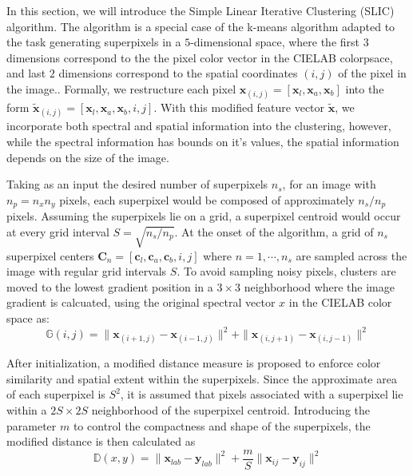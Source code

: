 In this section, we will introduce the Simple Linear Iterative Clustering (SLIC) algorithm. The algorithm is a special case of the k-means algorithm adapted to the task generating superpixels in a $5$-dimensional space, where the first $3$ dimensions correspond to the the pixel color vector in the CIELAB colorpsace, and last $2$ dimensions correspond to the spatial coordinates $(i,j)$ of the pixel in the image.. Formally, we restructure each pixel $\mathbf{x}_{(i,j)} = [\mathbf{x}_l, \mathbf{x}_a, \mathbf{x}_b]$ into the form $\tilde{\mathbf{x}}_{(i,j)} = [\mathbf{x}_l, \mathbf{x}_a, \mathbf{x}_b, i, j]$. With this modified feature vector $\tilde{\mathbf{x}}$, we incorporate both spectral and spatial information into the clustering, however, while the spectral information has bounds on it's values, the spatial information depends on the size of the image. 

Taking as an input the desired number of superpixels $n_s$, for an image with $n_p = n_x n_y$ pixels, each superpixel would be composed of approximately $n_s / n_p$ pixels. Assuming the superpixels lie on a grid, a superpixel centroid would occur at every grid interval $S = \sqrt{n_s/n_p}$. At the onset of the algorithm, a grid of $n_s$ superpixel centers $\mathbf{C}_n = [\mathbf{c}_{l}, \mathbf{c}_{a}, \mathbf{c}_{b}, i, j]$ where $n = 1, \cdots, n_s$ are sampled across the image with regular grid intervals $S$. To avoid sampling noisy pixels, clusters are moved to the lowest gradient position in a $3 \times 3$ neighborhood where the image gradient is calcuated, using the original spectral vector $x$ in the CIELAB color space as:
\begin{equation}
    \label{eq:slic-gradient}
    \mathbb{G}(i,j) = \|\mathbf{x}_{(i+1,j)} - \mathbf{x}_{(i-1,j)} \|^2 + \|\mathbf{x}_{(i,j+1)} - \mathbf{x}_{(i,j-1)} \|^2
\end{equation}

After initialization, a modified distance measure is proposed to enforce color similarity and spatial extent within the superpixels. Since the approximate area of each superpixel is $S^2$, it is assumed that pixels associated with a superpixel lie within a $2S \times 2S$ neighborhood of the superpixel centroid. Introducing the parameter $m$ to control the compactness and shape of the superpixels, the modified distance is then calculated as 
\begin{equation}
    \label{eq:slic-cielab-distance}
    \mathbb{D}(x, y) = \|\mathbf{x}_{lab} - \mathbf{y}_{lab}\|^2 + \frac{m}{S}\|\mathbf{x}_{ij} - \mathbf{y}_{ij}\|^2
\end{equation}

